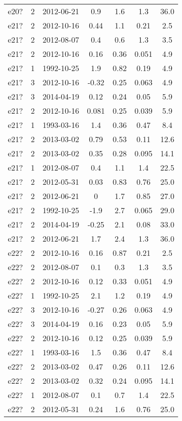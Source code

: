 \begin{table*}[htp]
\begin{tabular}{ccccccc}
e20? & 2 & 2012-06-21 & 0.9 & 1.6 & 1.3 & 36.0 \\
e21? & 2 & 2012-10-16 & 0.44 & 1.1 & 0.21 & 2.5 \\
e21? & 2 & 2012-08-07 & 0.4 & 0.6 & 1.3 & 3.5 \\
e21? & 2 & 2012-10-16 & 0.16 & 0.36 & 0.051 & 4.9 \\
e21? & 1 & 1992-10-25 & 1.9 & 0.82 & 0.19 & 4.9 \\
e21? & 3 & 2012-10-16 & -0.32 & 0.25 & 0.063 & 4.9 \\
e21? & 3 & 2014-04-19 & 0.12 & 0.24 & 0.05 & 5.9 \\
e21? & 2 & 2012-10-16 & 0.081 & 0.25 & 0.039 & 5.9 \\
e21? & 1 & 1993-03-16 & 1.4 & 0.36 & 0.47 & 8.4 \\
e21? & 2 & 2013-03-02 & 0.79 & 0.53 & 0.11 & 12.6 \\
e21? & 2 & 2013-03-02 & 0.35 & 0.28 & 0.095 & 14.1 \\
e21? & 1 & 2012-08-07 & 0.4 & 1.1 & 1.4 & 22.5 \\
e21? & 2 & 2012-05-31 & 0.03 & 0.83 & 0.76 & 25.0 \\
e21? & 2 & 2012-06-21 & 0 & 1.7 & 0.85 & 27.0 \\
e21? & 2 & 1992-10-25 & -1.9 & 2.7 & 0.065 & 29.0 \\
e21? & 2 & 2014-04-19 & -0.25 & 2.1 & 0.08 & 33.0 \\
e21? & 2 & 2012-06-21 & 1.7 & 2.4 & 1.3 & 36.0 \\
e22? & 2 & 2012-10-16 & 0.16 & 0.87 & 0.21 & 2.5 \\
e22? & 2 & 2012-08-07 & 0.1 & 0.3 & 1.3 & 3.5 \\
e22? & 2 & 2012-10-16 & 0.12 & 0.33 & 0.051 & 4.9 \\
e22? & 1 & 1992-10-25 & 2.1 & 1.2 & 0.19 & 4.9 \\
e22? & 3 & 2012-10-16 & -0.27 & 0.26 & 0.063 & 4.9 \\
e22? & 3 & 2014-04-19 & 0.16 & 0.23 & 0.05 & 5.9 \\
e22? & 2 & 2012-10-16 & 0.12 & 0.25 & 0.039 & 5.9 \\
e22? & 1 & 1993-03-16 & 1.5 & 0.36 & 0.47 & 8.4 \\
e22? & 2 & 2013-03-02 & 0.47 & 0.26 & 0.11 & 12.6 \\
e22? & 2 & 2013-03-02 & 0.32 & 0.24 & 0.095 & 14.1 \\
e22? & 1 & 2012-08-07 & 0.1 & 0.7 & 1.4 & 22.5 \\
e22? & 2 & 2012-05-31 & 0.24 & 1.6 & 0.76 & 25.0 \\

\end{tabular}
\end{table*}
